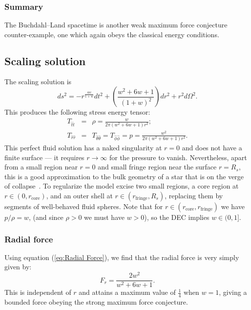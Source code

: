 \documentclass[12pt]{article}
\begin{document}
\subsubsection{Summary}

The Buchdahl--Land spacetime is another weak maximum force conjecture counter-example, one which again obeys the classical energy conditions.


\subsection{Scaling solution}
The scaling solution is
\begin{equation}
    ds^2 = -r^{\frac{4w}{1 + w}} dt^2 + \left(\frac{w^2 + 6w + 1}{(1+w)^2}\right) dr^2 + r^2d\Omega^2.
\end{equation}
%
This produces the following stress energy tensor:
%
\begin{eqnarray}
T_{\hat{t}\hat{t}} &=& \rho = \frac{w}{2\pi(w^2 + 6w + 1)r^2};\nonumber\\
T_{\hat{r}\hat{r}} &=& T_{\hat{\theta}\hat{\theta}} = T_{\hat{\phi}\hat{\phi}} = p = \frac{w^2}{2\pi(w^2 + 6w + 1)r^2}.
\end{eqnarray}
This perfect fluid solution has a naked singularity at $r=0$ and does not have a finite surface --- it  requires $r\rightarrow\infty$ for the pressure to vanish. Nevertheless, apart from a small region near $r=0$ and small fringe region near the surface $r=R_s$, this is a good approximation to the bulk geometry of a star that is on the verge of collapse~\cite{collapse,Yunes}. 
To regularize the model excise two small regions, a core region at $r\in(0,r_\mathrm{core})$, and an outer shell at $r\in(r_\mathrm{fringe},R_s)$, replacing them by segments of well-behaved fluid spheres.
Note that for $r\in(r_\mathrm{core},r_\mathrm{fringe})$ we have $p/\rho=w$, (and since $\rho>0$ we must have $w>0$), so the DEC implies $w\in(0,1]$. 

\subsubsection{Radial force}
Using equation (\ref{eq:Radial Force}), we find that the radial force is very simply given by:
%
\begin{equation}
    F_r = \frac{2w^2}{w^2 + 6w + 1}.
\end{equation}
%
This is independent of $r$ and attains a maximum value of $\frac{1}{4}$ when $w=1$, giving a bounded force obeying the strong maximum force conjecture.
\end{document}

